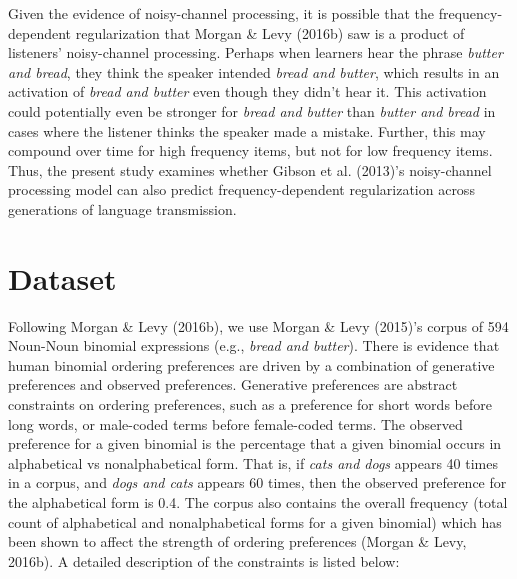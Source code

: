 \documentclass[10pt, letterpaper]{article}
\begin{document}
Given the evidence of noisy-channel processing, it is possible that the
frequency-dependent regularization that Morgan \& Levy (2016b) saw is a
product of listeners' noisy-channel processing. Perhaps when learners
hear the phrase \emph{butter and bread}, they think the speaker intended
\emph{bread and butter}, which results in an activation of \emph{bread
and butter} even though they didn't hear it. This activation could
potentially even be stronger for \emph{bread and butter} than
\emph{butter and bread} in cases where the listener thinks the speaker
made a mistake. Further, this may compound over time for high frequency
items, but not for low frequency items. Thus, the present study examines
whether Gibson et al. (2013)'s noisy-channel processing model can also
predict frequency-dependent regularization across generations of
language transmission.

\hypertarget{dataset}{%
\section{Dataset}\label{dataset}}

Following Morgan \& Levy (2016b), we use Morgan \& Levy (2015)'s corpus
of 594 Noun-Noun binomial expressions (e.g., \emph{bread and butter}).
There is evidence that human binomial ordering preferences are driven by
a combination of generative preferences and observed preferences.
Generative preferences are abstract constraints on ordering preferences,
such as a preference for short words before long words, or male-coded
terms before female-coded terms. The observed preference for a given
binomial is the percentage that a given binomial occurs in alphabetical
vs nonalphabetical form. That is, if \emph{cats and dogs} appears 40
times in a corpus, and \emph{dogs and cats} appears 60 times, then the
observed preference for the alphabetical form is 0.4. The corpus also
contains the overall frequency (total count of alphabetical and
nonalphabetical forms for a given binomial) which has been shown to
affect the strength of ordering preferences (Morgan \& Levy, 2016b). A
detailed description of the constraints is listed below:
\end{document}
